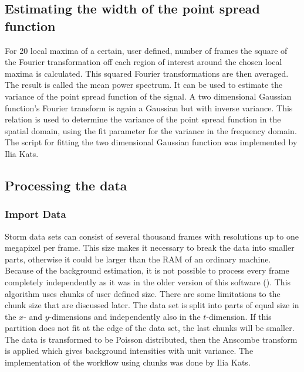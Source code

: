 \subsection{Estimating the width of the point spread function}
For 20 local maxima of a certain, user defined, number of frames the square of the Fourier transformation off each region of interest around the chosen local maxima is calculated. This squared Fourier transformations are then averaged. The result is called the mean power spectrum. It can be used to estimate the variance of the point spread function of the signal. A two dimensional Gaussian function's Fourier transform is again a Gaussian but with inverse variance. This relation is used to determine the variance of the point spread function in the spatial domain, using the fit parameter for the variance in the frequency domain.\newline
The script for fitting the two dimensional Gaussian function was implemented by Ilia Kats.
\subsection{Processing the data}
\subsubsection{Import Data}
Storm data sets can consist of several thousand frames with resolutions up to one megapixel per frame. This size makes it necessary to break the data into smaller parts, otherwise it could be larger than the RAM of an ordinary machine. Because of the background estimation, it is not possible to process every frame completely independently as it was in the older version of this software (\cite{MAJoachim}). 
\newline
This algorithm uses chunks of user defined size. There are some limitations to the chunk size that are discussed later. The data set is split into parts of equal size in the $x$- and $y$-dimensions and independently also in the $t$-dimension. If this partition does not fit at the edge of the data set, the last chunks will be smaller.\newline
The data is transformed to be Poisson distributed, then the Anscombe transform is applied which gives background intensities with unit variance.\newline
The implementation of the workflow using chunks was done by Ilia Kats.
